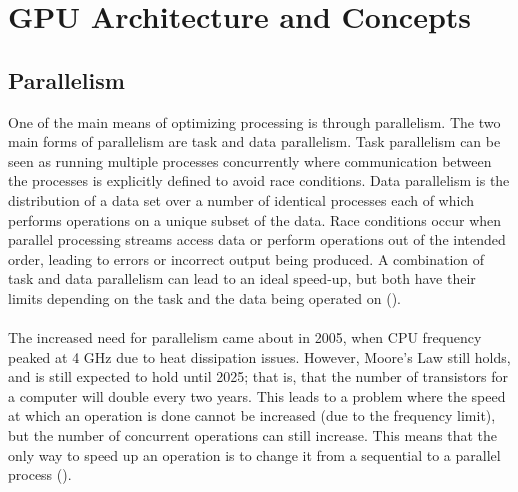 \section{GPU Architecture and Concepts}\label{gpu}
\subsection{Parallelism}\label{gpu:sec:par}
One of the main means of optimizing processing is through parallelism. The two main forms of parallelism are task and data parallelism. Task parallelism can be seen as running multiple processes concurrently where communication between the processes is explicitly defined to avoid race conditions. Data parallelism is the distribution of a data set over a number of identical processes each of which performs operations on a unique subset of the data. Race conditions occur when parallel processing streams access data or perform operations out of the intended order, leading to errors or incorrect output being produced. A combination of task and data parallelism can lead to an ideal speed-up, but both have their limits depending on the task and the data being operated on (\cite{subhlok1993exploiting}).
\\
\\
The increased need for parallelism came about in 2005, when CPU frequency peaked at 4 GHz due to heat dissipation issues. However, Moore's Law still holds, and is still expected to hold until 2025; that is, that the number of transistors for a computer will double every two years. This leads to a problem where the speed at which an operation is done cannot be increased (due to the frequency limit), but the number of concurrent operations can still increase. This means that the only way to speed up an operation is to change it from a sequential to a parallel process (\cite{rajan2013informatics}).
